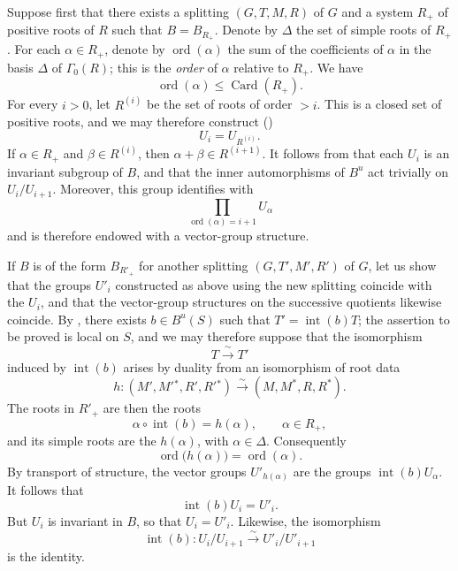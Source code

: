 Suppose first that there exists a splitting \((G,T,M,R)\) of \(G\)
and a system \(R_+\) of positive roots of \(R\) such that
\(B=B_{R_+}\). Denote by \(\Delta\) the set of simple roots of
\(R_+\). For each \(\alpha\in R_+\), denote by
\(\operatorname{ord}(\alpha)\) the sum of the coefficients of
\(\alpha\) in the basis \(\Delta\) of \(\Gamma_0(R)\); this is the
\emph{order} of \(\alpha\) relative to \(R_+\). We have
\[
  \operatorname{ord}(\alpha)\leq\operatorname{Card}(R_+).
\]
For every \(i>0\), let \(R^{(i)}\) be the set of roots of order
\(>i\). This is a closed set of positive roots, and we may therefore
construct \textup{()}
\[
  U_i=U_{R^{(i)}}.
\]
If \(\alpha\in R_+\) and \(\beta\in R^{(i)}\), then
\(\alpha+\beta\in R^{(i+1)}\). It follows from  that each
\(U_i\) is an invariant subgroup of \(B\), and that the inner
automorphisms of \(B^u\) act trivially on \(U_i/U_{i+1}\). Moreover,
this group identifies with
\[
  \prod_{\operatorname{ord}(\alpha)=i+1}U_\alpha
\]
and is therefore endowed with a vector-group structure.

If \(B\) is of the form \(B_{R'_+}\) for another splitting
\((G,T',M',R')\) of \(G\), let us show that the groups \(U'_i\)
constructed as above using the new splitting coincide with the
\(U_i\), and that the vector-group structures on the successive
quotients likewise coincide. By , there exists
\(b\in B^u(S)\) such that \(T'=\operatorname{int}(b)T\); the
assertion to be proved is local on \(S\), and we may therefore
suppose that the isomorphism
\[
  T\xrightarrow{\;\sim\;}T'
\]
induced by \(\operatorname{int}(b)\) arises by duality from an
isomorphism of root data
\[
  h:(M',M'{}^*,R',R'{}^*)
  \xrightarrow{\;\sim\;}
  (M,M^*,R,R^*).
\]
The roots in \(R'_+\) are then the roots
\[
  \alpha\circ\operatorname{int}(b)=h(\alpha),
  \qquad \alpha\in R_+,
\]
and its simple roots are the \(h(\alpha)\), with
\(\alpha\in\Delta\). Consequently
\[
  \operatorname{ord}\bigl(h(\alpha)\bigr)
  =
  \operatorname{ord}(\alpha).
\]
By transport of structure, the vector groups
\(U'_{h(\alpha)}\) are the groups
\(\operatorname{int}(b)U_\alpha\). It follows that
\[
  \operatorname{int}(b)U_i=U'_i.
\]
But \(U_i\) is invariant in \(B\), so that \(U_i=U'_i\).
Likewise, the isomorphism
\[
  \operatorname{int}(b):
  U_i/U_{i+1}\xrightarrow{\;\sim\;}U'_i/U'_{i+1}
\]
is the identity.

